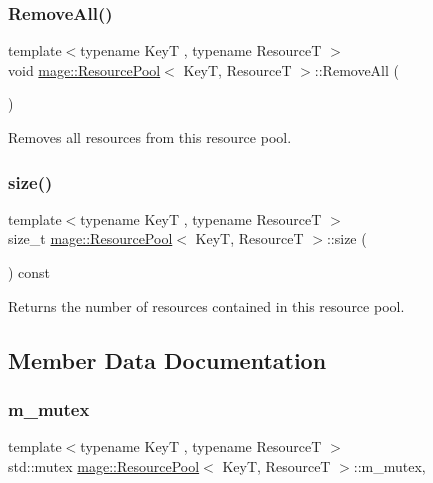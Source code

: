 \subsubsection{\texorpdfstring{Remove\+All()}{RemoveAll()}}
{\footnotesize\ttfamily template$<$typename KeyT , typename ResourceT $>$ \\
void \hyperlink{classmage_1_1_resource_pool}{mage\+::\+Resource\+Pool}$<$ KeyT, ResourceT $>$\+::Remove\+All (\begin{DoxyParamCaption}{ }\end{DoxyParamCaption})\hspace{0.3cm}{\ttfamily [noexcept]}}

Removes all resources from this resource pool. \hypertarget{classmage_1_1_resource_pool_ab032684a1ed5a782a61f663e269a994a}{}\label{classmage_1_1_resource_pool_ab032684a1ed5a782a61f663e269a994a} 
\subsubsection{\texorpdfstring{size()}{size()}}
{\footnotesize\ttfamily template$<$typename KeyT , typename ResourceT $>$ \\
size\+\_\+t \hyperlink{classmage_1_1_resource_pool}{mage\+::\+Resource\+Pool}$<$ KeyT, ResourceT $>$\+::size (\begin{DoxyParamCaption}{ }\end{DoxyParamCaption}) const\hspace{0.3cm}{\ttfamily [noexcept]}}

Returns the number of resources contained in this resource pool. 

\subsection{Member Data Documentation}
\hypertarget{classmage_1_1_resource_pool_a3d6d7b0e2e9c3271f8ae3b7c2fa704ba}{}\label{classmage_1_1_resource_pool_a3d6d7b0e2e9c3271f8ae3b7c2fa704ba} 
\subsubsection{\texorpdfstring{m\+\_\+mutex}{m\_mutex}}
{\footnotesize\ttfamily template$<$typename KeyT , typename ResourceT $>$ \\
std\+::mutex \hyperlink{classmage_1_1_resource_pool}{mage\+::\+Resource\+Pool}$<$ KeyT, ResourceT $>$\+::m\+\_\+mutex\hspace{0.3cm}{\ttfamily [mutable]}, {\ttfamily [private]}}

